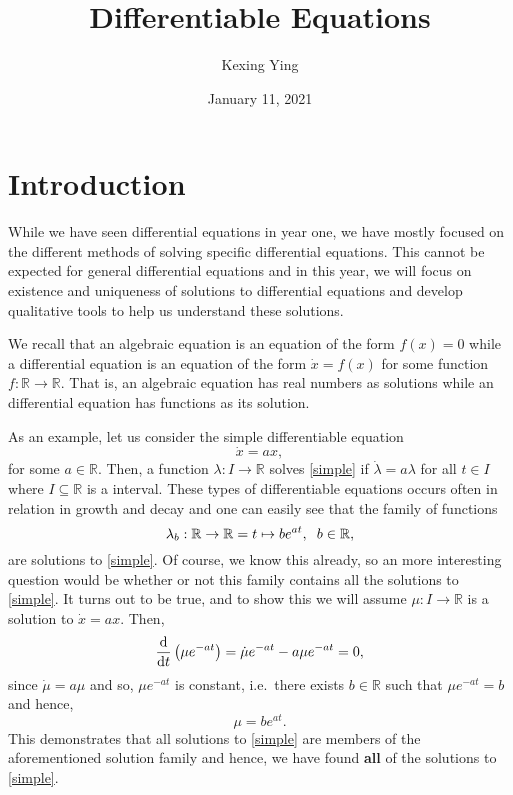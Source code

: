 \documentclass[
]{article}
\title{Differentiable Equations}
\author{Kexing Ying}
\date{January 11, 2021}
\theoremstyle{definition}
\theoremstyle{definition}
\begin{document}
\maketitle

{
\hypersetup{linkcolor=}
\setcounter{tocdepth}{2}
\tableofcontents
}
\newpage

\hypertarget{introduction}{%
\section{Introduction}\label{introduction}}

While we have seen differential equations in year one, we have mostly
focused on the different methods of solving specific differential
equations. This cannot be expected for general differential equations
and in this year, we will focus on existence and uniqueness of solutions
to differential equations and develop qualitative tools to help us
understand these solutions.

We recall that an algebraic equation is an equation of the form
\(f(x) = 0\) while a differential equation is an equation of the form
\(\dot x = f(x)\) for some function \(f : \mathbb{R} \to \mathbb{R}\).
That is, an algebraic equation has real numbers as solutions while an
differential equation has functions as its solution.

As an example, let us consider the simple differentiable equation
\begin{equation}\label{simple}
  \dot x = a x,
\end{equation} for some \(a \in \mathbb{R}\). Then, a function
\(\lambda : I \to \mathbb{R}\) solves \ref{simple} if
\(\dot \lambda = a \lambda\) for all \(t \in I\) where
\(I \subseteq \mathbb{R}\) is a interval. These types of differentiable
equations occurs often in relation in growth and decay and one can
easily see that the family of functions
\[\lambda_b : \mathbb{R} \to \mathbb{R} = t \mapsto b e^{at}, \hspace{2mm} b \in \mathbb{R},\]
are solutions to \ref{simple}. Of course, we know this already, so an
more interesting question would be whether or not this family contains
all the solutions to \ref{simple}. It turns out to be true, and to show
this we will assume \(\mu : I \to \mathbb{R}\) is a solution to
\(\dot x = a x\). Then,
\[\dv{t}\left(\mu e^{-at}\right) = \dot \mu e^{-at} - a\mu e^{-at} = 0,\]
since \(\dot \mu = a \mu\) and so, \(\mu e^{-at}\) is constant,
i.e.~there exists \(b \in \mathbb{R}\) such that \(\mu e^{-at} = b\) and
hence, \[\mu = b e^{at}.\] This demonstrates that all solutions to
\ref{simple} are members of the aforementioned solution family and
hence, we have found \textbf{all} of the solutions to \ref{simple}.
\end{document}
